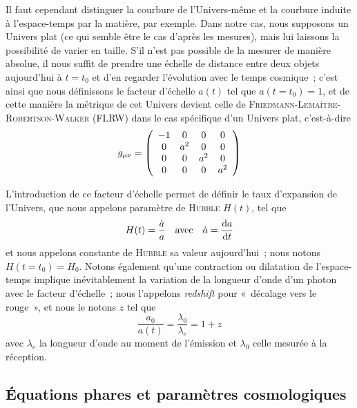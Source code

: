 \documentclass[../main/main.tex]{subfiles}
\begin{document}
Il faut cependant distinguer la courbure de l'Univers-même et la courbure
induite à l'espace-temps par la matière, par exemple. Dans notre cas, nous
supposons un Univers plat (ce qui semble être le cas d'après les mesures), mais
lui laissons la possibilité de varier en taille. S'il n'est pas possible de la
mesurer de manière absolue, il nous suffit de prendre une échelle de distance
entre deux objets aujourd'hui à $t = t_0$ et d'en regarder l'évolution avec le
temps cosmique~; c'est ainsi que nous définissons le facteur d'échelle $a(t)$
tel que $a(t=t_0) = 1$, et de cette manière la métrique de cet Univers devient
celle de \textsc{Friedmann}-\textsc{Lemaître}-\textsc{Robertson}-\textsc{Walker}
(FLRW) dans le cas spécifique d'un Univers plat, c'est-à-dire
\begin{equation}
    g_{\mu\nu} = \left(\begin{array}{c c c c}
            -1 & 0 & 0 & 0\\
            0 & a^2 & 0 & 0\\
            0 & 0 & a^2 & 0\\
            0 & 0 & 0 & a^2\\
    \end{array}\right)
\end{equation}

L'introduction de ce facteur d'échelle permet de définir le taux d'expansion de
l'Univers, que nous appelons paramètre de \textsc{Hubble} $H(t)$, tel que
\begin{equation}\label{eq:hz}
    H(t) = \frac{\dot{a}}{a}\quad\text{avec}\quad\dot{a} = \dv{a}{t}
\end{equation}
et nous appelons constante de \textsc{Hubble} sa valeur aujourd'hui~; nous
notons $H(t=t_0) = H_0$. Notons également qu'une contraction ou dilatation de
l'espace-temps implique inévitablement la variation de la longueur d'onde d'un
photon avec le facteur d'échelle~; nous l'appelons \textit{redshift} pour
«~décalage vers le rouge~», et nous le notons $z$ tel que
\begin{equation}\label{eq:z}
    \frac{a_0}{a(t)} = \frac{\lambda_0}{\lambda_e} = 1+z
\end{equation}
avec $\lambda_e$ la longueur d'onde au moment de l'émission et $\lambda_0$ celle
mesurée à la réception.

\subsection{Équations phares et paramètres cosmologiques}\label{ssec:rgeq}
\end{document}
